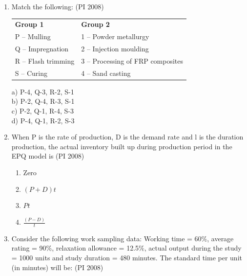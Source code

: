 \documentclass[journal,12pt,onecolumn]{IEEEtran}
\theoremstyle{remark}
\begin{document}
\begin{enumerate}
\vspace{0.5cm}
\item %
Match the following:
\hfill{(PI 2008)}\\
\begin{tabular}{ll}
\textbf{Group 1} & \textbf{Group 2} \\
P -- Mulling & 1 -- Powder metallurgy \\
Q -- Impregnation & 2 -- Injection moulding \\
R -- Flash trimming & 3 -- Processing of FRP composites \\
S -- Curing & 4 -- Sand casting \\
\end{tabular}

\noindent
a) P-4, Q-3, R-2, S-1 \\
b) P-2, Q-4, R-3, S-1 \\
c) P-2, Q-1, R-4, S-3 \\
d) P-4, Q-1, R-2, S-3

\vspace{0.5cm}
\item %
When P is the rate of production, D is the demand rate and l is the duration production, the actual inventory built up during production period in the EPQ model is 
\hfill{(PI 2008)}
\begin{multicols}{4}
    \begin{enumerate}
\item Zero
\item $(P+D)t$
\item $Pt$
\item $\frac{(P-D)}{t}$
    
    \end{enumerate}
\end{multicols}
\vspace{1cm}

\item %
Consider the following work sampling data:  
Working time = 60\%, average rating = 90\%, relaxation allowance = 12.5\%,  
actual output during the study = 1000 units and study duration = 480 minutes.  
The standard time per unit (in minutes) will be:
\hfill{(PI 2008)}


\end{enumerate}
\end{document}
